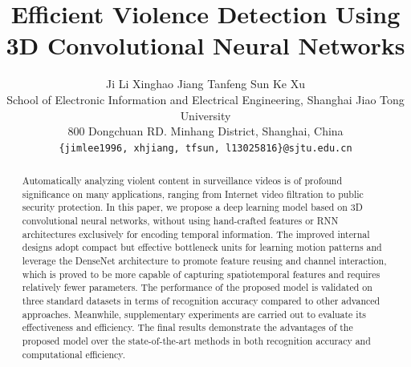 \documentclass[10pt,twocolumn,letterpaper]{article}
\begin{document}
\title{Efficient Violence Detection Using 3D Convolutional Neural Networks}

\author{Ji Li \quad Xinghao Jiang \quad Tanfeng Sun \quad Ke Xu\\
School of Electronic Information and Electrical Engineering, Shanghai Jiao Tong University\\
800 Dongchuan RD. Minhang District, Shanghai, China\\
{\tt\small \{jimlee1996, xhjiang, tfsun, l13025816\}@sjtu.edu.cn}
}

\maketitle
\thispagestyle{empty}

\begin{abstract}
Automatically analyzing violent content in surveillance videos is of profound significance on many applications, ranging from Internet video filtration to public security protection. In this paper, we propose a deep learning model based on 3D convolutional neural networks, without using hand-crafted features or RNN architectures exclusively for encoding temporal information. The improved internal designs adopt compact but effective bottleneck units for learning motion patterns and leverage the DenseNet architecture to promote feature reusing and channel interaction, which is proved to be more capable of capturing spatiotemporal features and requires relatively fewer parameters. The performance of the proposed model is validated on three standard datasets in terms of recognition accuracy compared to other advanced approaches. Meanwhile, supplementary experiments are carried out to evaluate its effectiveness and efficiency. The final results demonstrate the advantages of the proposed model over the state-of-the-art methods in both recognition accuracy and computational efficiency.
\end{abstract}

\end{document}
